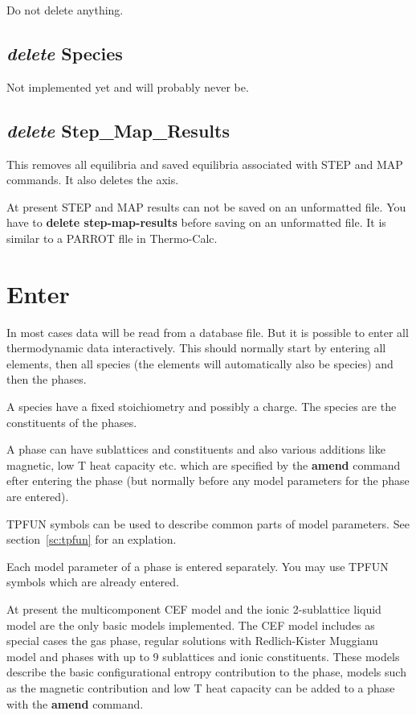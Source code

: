 \documentclass[11pt]{article}
\begin{document}
Do not delete anything.

\hypertarget{Delete species}{}
\subsection{{\em delete} Species}

Not implemented yet and will probably never be.

\hypertarget{Delete step-map-results}{}
\subsection{{\em delete} Step\_Map\_Results}

This removes all equilibria and saved equilibria associated with
STEP and MAP commands.  It also deletes the axis.

At present STEP and MAP results can not be saved on an unformatted
file.  You have to {\bf delete step-map-results} before saving on an
unformatted file.  It is similar to a PARROT flle in Thermo-Calc.

\hypertarget{Enter}{}
\section{Enter }

In most cases data will be read from a database file.  But it is
possible to enter all thermodynamic data interactively.  This should
normally start by entering all elements, then all species (the
elements will automatically also be species) and then the phases.

A species have a fixed stoichiometry and possibly a charge.  The
species are the constituents of the phases.

A phase can have sublattices and constituents and also various
additions like magnetic, low T heat capacity etc. which are specified
by the {\bf amend} command efter entering the phase (but normally
before any model parameters for the phase are entered).

TPFUN symbols can be used to describe common parts of model
parameters.  See section~\ref{sc:tpfun} for an explation.

Each model parameter of a phase is entered separately.  You may use
TPFUN symbols which are already entered.

At present the multicomponent CEF model and the ionic 2-sublattice
liquid model are the only basic models implemented.  The CEF model
includes as special cases the gas phase, regular solutions with
Redlich-Kister Muggianu model and phases with up to 9 sublattices and
ionic constituents.  These models describe the basic configurational
entropy contribution to the phase, models such as the magnetic
contribution and low T heat capacity can be added to a phase with the
{\bf amend} command.
\end{document}
